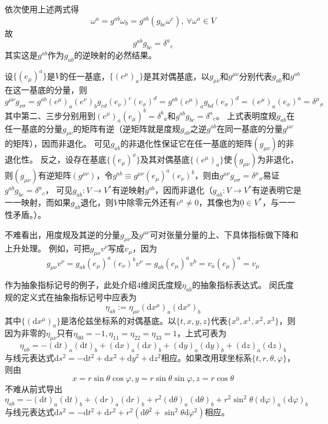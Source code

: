 依次使用上述两式得
$$\omega^a = g^{ab}\omega_b = g^{ab}(g_{bc}\omega^c), ~ \forall \omega^a \in V$$
故
$$g^{ab}g_{bc} = \delta^a{}_c$$
其实这是$g^{ab}$作为$g_{ab}$的逆映射的必然结果。

设$\{(e_\mu)^a\}$是$V$的任一基底，$\{(e^\mu)_a\}$是其对偶基底，以$g_{\mu\nu}$和$g^{\mu\nu}$分别代表$g_{ab}$和$g^{ab}$在这一基底的分量，则
$$g^{\mu\nu}g_{\nu\sigma} = g^{ab}(e^\mu)_a(e^\nu)_bg_{cd}(e_\nu)^c(e_\sigma)^d = g^{ab}(e^\mu)_ag_{bd}(e_\sigma)^d = (e^\mu)_a(e_\sigma)^a = \delta^\mu{}_\sigma$$
其中第二、三步分别用到$(e^\mu)_a(e_\mu)^b = \delta^b{}_a$和$g^{ab}g_{bc} = \delta^a{}_c$。
上式表明度规$g_{ab}$在任一基底的分量$g_{\mu\nu}$的矩阵有逆（逆矩阵就是度规$g_{ab}$之逆$g^{ab}$在同一基底的分量$g^{\mu\nu}$的矩阵），因而非退化。
可见$g_{ab}$的非退化性保证它在任一基底的矩阵$(g_{\mu\nu})$的非退化性。
反之，设存在基底$\{(e_\mu)^a\}$及其对偶基底$\{(e^\mu)_a\}$使$(g_{\mu\nu})$为非退化，则$(g_{\mu\nu})$有逆矩阵$(g^{\mu\nu})$，令$g^{ab} \equiv g^{\mu\nu}(e_\mu)^a(e_\nu)^b$，则由$g^{\mu\nu}g_{\nu\sigma} = \delta^\mu{}_\sigma$易证$g^{ab}g_{bc} = \delta^a{}_c$，
可见$g_{ab} \colon V \to V^*$有逆映射$g^{ab}$，因而非退化（$g_{ab} \colon V \to V^*$有逆表明它是一一映射，而如果$g_{ab}$退化，则$V$中除零元外还有$v^a \neq 0$，其像也为$\underline{0} \in V^*$，与一一性矛盾。）。

不难看出，用度规及其逆的分量$g_{\mu\nu}$及$g^{\mu\nu}$可对张量分量的上、下具体指标做下降和上升处理。
例如，可把$g_{\mu\nu}v^\nu$写成$v_\mu$，因为
$$g_{\mu\nu}v^\nu = g_{ab}(e_\mu)^a(e_\nu)^bv^\nu = g_{ab}(e_\mu)^av^b = v_a(e_\mu)^a = v_\mu$$

作为抽象指标记号的例子，此处介绍$4$维闵氏度规$\eta_{ab}$的抽象指标表达式。
闵氏度规的定义式在抽象指标记号中应表为
$$\eta_{ab} := \eta_{\mu\nu}(\mathrm{d}x^\mu)_a(\mathrm{d}x^\nu)_b$$
其中$\{(\mathrm{d}x^\mu)_a\}$是洛伦兹坐标系的对偶基底。以$\{t, x, y, z\}$代表$\{x^0, x^1, x^2, x^3\}$，则因为非零的$\eta_{\mu\nu}$只有$\eta_{00} = -1, \eta_{11} = \eta_{22} = \eta_{33} = 1$，上式可表为
$$\eta_{ab} = -(\mathrm{d}t)_a(\mathrm{d}t)_b + (\mathrm{d}x)_a(\mathrm{d}x)_b + (\mathrm{d}y)_a(\mathrm{d}y)_b + (\mathrm{d}z)_a(\mathrm{d}z)_b$$
与线元表达式$\mathrm{d}s^2 = -\mathrm{d}t^2 + \mathrm{d}x^2 + \mathrm{d}y^2 + \mathrm{d}z^2$相应。如果改用球坐标系$\{t, r, \theta, \varphi\}$，则由
$$x = r\sin\theta\cos\varphi, y = r\sin\theta\sin\varphi, z = r\cos\theta$$
不难从前式导出
$$\eta_{ab} = -(\mathrm{d}t)_a(\mathrm{d}t)_b + (\mathrm{d}r)_a(\mathrm{d}r)_b + r^2(\mathrm{d}\theta)_a(\mathrm{d}\theta)_b + r^2\sin^2\theta(\mathrm{d}\varphi)_a(\mathrm{d}\varphi)_b$$
与线元表达式$\mathrm{d}s^2 = -\mathrm{d}t^2 + \mathrm{d}r^2 + r^2(\mathrm{d}\theta^2 + \sin^2\theta\mathrm{d}\varphi^2)$相应。

